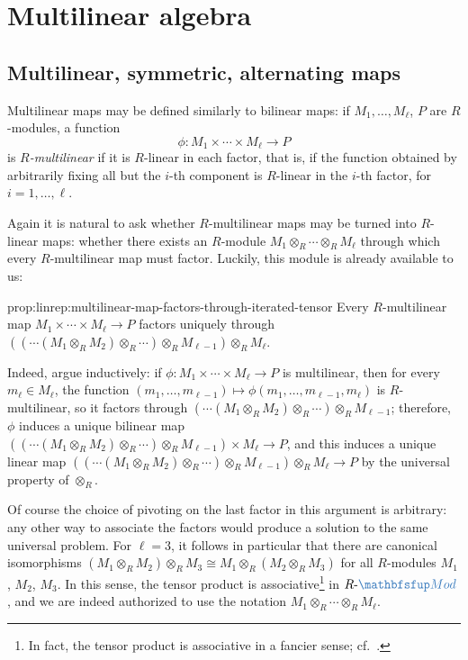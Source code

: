 \section{Multilinear algebra}
\label{sec:linrep:multilinear-algebra}


\subsection{Multilinear, symmetric, alternating maps}
\label{subsec:linrep:multilinear-symmetric-alternating-maps}
Multilinear maps may be defined similarly to bilinear maps: if
$M_1, \dots, M_\ell$, $P$ are $R$-modules, a function
\[
  \phi : M_1 \times \cdots \times M_\ell \to P
\]
is \emph{$R$-multilinear} if it is $R$-linear in each factor, that is,
if the function obtained by arbitrarily fixing all but the $i$-th
component is $R$-linear in the $i$-th factor, for $i = 1, \dots, \ell$.

Again it is natural to ask whether $R$-multilinear maps may be turned
into $R$-linear maps: whether there exists an $R$-module
$M_1 \otimes_R \cdots \otimes_R M_\ell$ through which every
$R$-multilinear map must factor. Luckily, this module is already
available to us:

\begin{prop}{}{prop:linrep:multilinear-map-factors-through-iterated-tensor}
  Every $R$-multilinear map $M_1 \times \cdots \times M_\ell \to P$
  factors uniquely through
  $((\cdots(M_1 \otimes_R M_2) \otimes_R \cdots) \otimes_R M_{\ell-1})
  \otimes_R M_\ell$.
\end{prop}

Indeed, argue inductively: if
$\phi : M_1 \times \cdots \times M_\ell \to P$ is multilinear, then
for every $m_\ell \in M_\ell$, the function
$(m_1, \dots, m_{\ell-1}) \mapsto \phi(m_1, \dots, m_{\ell-1},
m_\ell)$ is $R$-multilinear, so it factors through
$(\cdots(M_1 \otimes_R M_2) \otimes_R \cdots) \otimes_R M_{\ell-1}$;
therefore, $\phi$ induces a unique bilinear map
$((\cdots(M_1 \otimes_R M_2) \otimes_R \cdots) \otimes_R M_{\ell-1})
\times M_\ell \to P$, and this induces a unique linear map
$((\cdots(M_1 \otimes_R M_2) \otimes_R \cdots) \otimes_R M_{\ell-1})
\otimes_R M_\ell \to P$ by the universal property of $\otimes_R$.

Of course the choice of pivoting on the last factor in this argument
is arbitrary: any other way to associate the factors would produce a
solution to the same universal problem. For $\ell = 3$, it follows in
particular that there are canonical isomorphisms
$(M_1 \otimes_R M_2) \otimes_R M_3 \cong M_1 \otimes_R (M_2 \otimes_R
M_3)$ for all $R$-modules $M_1$, $M_2$, $M_3$. In this sense, the
tensor product is associative\footnote{In fact, the tensor product is
  associative in a fancier sense; cf.\
  .} in
$R\text{-}\categ{Mod}$, and we are indeed authorized to use the
notation $M_1 \otimes_R \cdots \otimes_R M_\ell$.

